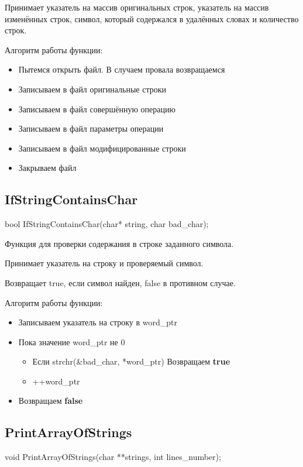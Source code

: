 \documentclass[12pt,a4paper]{article}  %
\begin{document}
	Принимает указатель на массив оригинальных строк, указатель на массив изменённых строк, символ, который содержался в удалённых словах и количество строк.
	
	
	Алгоритм работы функции:
	
	\begin{itemize}
		\item Пытемся открыть файл. В случаем провала возвращаемся
		\item Записываем в файл оригинальные строки
		\item Записываем в файл совершённую операцию
		\item Записываем в файл параметры операции
		\item Записываем в файл модифицированные строки
		\item Закрываем файл
	\end{itemize}
	
	\fi
	
	\subsection*{IfStringContainsChar}
	bool IfStringContainsChar(char* string, char bad\_char);
	
	Функция для проверки содержания в строке заданного символа.
	
	Принимает указатель на строку и проверяемый символ.
	
	Возвращает true, если символ найден, false в противном случае.
	
	
	Алгоритм работы функции:
	
	\begin{itemize}
		\item Записываем указатель на строку в word\_ptr
		\item Пока значение word\_ptr не 0
		\begin{itemize}
			\item Если strchr(\&bad\_char, *word\_ptr) Возвращаем \textbf{true}
			\item ++word\_ptr
		\end{itemize}
		\item Возвращаем \textbf{false}
	\end{itemize}
	
	\fi
	
	\subsection*{PrintArrayOfStrings}
	void PrintArrayOfStrings(char **strings, int lines\_number);
	
\end{document}
